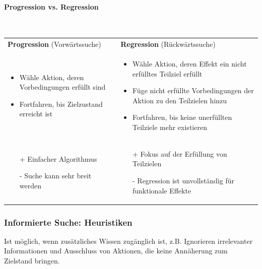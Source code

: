 \paragraph*{Progression vs. Regression} \mbox{}
\vspace{1em} \\
\begin{tabular}{p{} p{}}
\textbf{Progression} (Vorwärtssuche) & \textbf{Regression} (Rückwärtssuche) \\
\begin{itemize}
	\item Wähle Aktion, deren Vorbedingungen erfüllt sind
	\item Fortfahren, bis Zielzustand erreicht ist
\end{itemize}
&
\begin{itemize}
	\item Wähle Aktion, deren Effekt ein nicht erfülltes Teilziel erfüllt
	\item Füge nicht erfüllte Vorbedingungen der Aktion zu den Teilzielen hinzu
	\item Fortfahren, bis keine unerfüllten Teilziele mehr existieren
\end{itemize}
\\
\begin{itemize}
	\item[+] Einfacher Algorithmus
	\item[-] Suche kann sehr breit werden
\end{itemize}
&
\begin{itemize}
	\item[+] Fokus auf der Erfüllung von Teilzielen
	\item[-] Regression ist unvollständig für funktionale Effekte
\end{itemize}
\end{tabular}


\subsubsection{Informierte Suche: Heuristiken}
Ist möglich, wenn zusätzliches Wissen zugänglich ist, z.B. Ignorieren irrelevanter Informationen und Ausschluss von Aktionen, die keine Annäherung zum Zielstand bringen.

